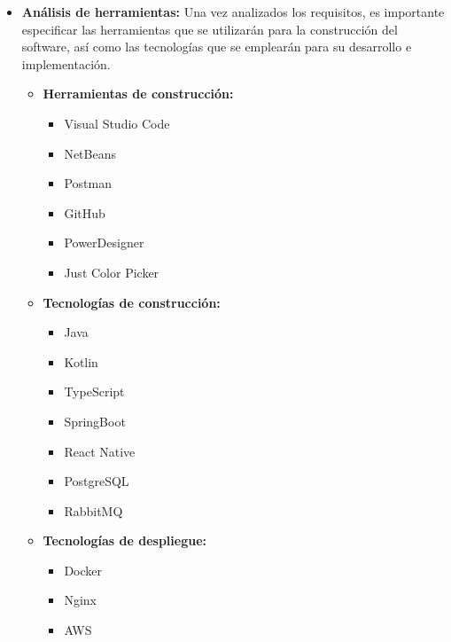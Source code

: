 \documentclass[lettersize,journal]{IEEEtran}
\begin{document}
\begin{itemize}
	\noindent Las tecnologías seleccionadas son: Whisper (audio a texto), pyttsx3 y Edge-TTS (texto a audio), blip-image-captioning-base (descripción de imágenes) y Helsinki-NLP/opus-mt-en-es / es-en (traducción). Además, pyttsx3 actúa como respaldo ante fallos de Edge-TTS, garantizando continuidad en la conversión. En el caso de subtitulación, el audio se extrae y transcribe con Whisper, y las salidas se codifican en Base64 para su envío en formato JSON.
	
	\item \textbf{Análisis de herramientas:} 
	\noindent Una vez analizados los requisitos, es importante especificar las herramientas que se utilizarán para la construcción del software, así como las tecnologías que se emplearán para su desarrollo e implementación.
	
	\begin{itemize}
		\item \textbf{Herramientas de construcción:}
		\begin{itemize}
			\item Visual Studio Code
			\item NetBeans
			\item Postman
			\item GitHub
			\item PowerDesigner
			\item Just Color Picker
		\end{itemize}
		
		\item \textbf{Tecnologías de construcción:}
		\begin{itemize}
			\item Java
			\item Kotlin
			\item TypeScript
			\item SpringBoot
			\item React Native
			\item PostgreSQL
			\item RabbitMQ
		\end{itemize}
		
		\item \textbf{Tecnologías de despliegue:}
		\begin{itemize}
			\item Docker
			\item Nginx
			\item AWS
		\end{itemize}
	\end{itemize}
	

\end{itemize}
\end{document}
